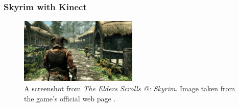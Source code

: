 \documentclass[11pt]{article}
\makeatletter
\newcommand*{\rom}[1]{\expandafter\@slowromancap\romannumeral #1@}
\makeatother
\begin{document}
\newpage
\subsubsection{Skyrim with Kinect}

\begin{figure}
  \begin{center}
    \includegraphics[width=0.5\textwidth]{skyrim-overview-media--riverwood.jpg}
  \end{center}
  \caption{A screenshot from \textit{The Elders Scrolls \rom{5}: Skyrim}. Image taken from the game's official web page \cite{RefWorks:23}.}
\end{figure}
\end{document}
